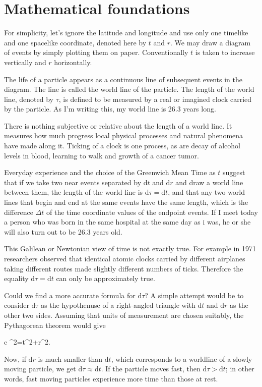 \documentclass[11pt,oneside%
]{memoir}
\newenvironment{eqna}{\begin{IEEEeqnarray*}{c}}{\end{IEEEeqnarray*}\ignorespacesafterend}
\newcommand{\dd}{\mathrm{d}}
\begin{document}
\section{Mathematical foundations}

For simplicity, let's ignore the latitude and longitude and use only one timelike and one spacelike coordinate, denoted here by \(t\) and \(r\). We may draw a diagram of events by simply plotting them on paper. Conventionally \(t\) is taken to increase vertically and \(r\) horizontally.

\newcommand{\myage}{26.3}

The life of a particle appears as a continuous line of subsequent events in the diagram. The line is called the world line of the particle. The length of the world line, denoted by \(\tau\), is defined to be measured by a real or imagined clock carried by the particle. As I'm writing this, my world line is {\myage} years long.

There is nothing subjective or relative about the length of a world line. It measures how much progress local physical processes and natural phenomena have made along it. Ticking of a clock is one process, as are decay of alcohol levels in blood, learning to walk and growth of a cancer tumor.

Everyday experience and the choice of the Greenwich Mean Time as \(t\) suggest that if we take two near events separated by \(\dd t\) and \(\dd r\) and draw a world line between them, the length of the world line is \(\dd\tau = \dd t\), and that any two world lines that begin and end at the same events have the same length, which is the difference \(\Delta t\) of the time coordinate values of the endpoint events. If I meet today a person who was born in the same hospital at the same day as i was, he or she will also turn out to be {\myage} years old.

This Galilean or Newtonian view of time is not exactly true. For example in 1971 researchers observed that identical atomic clocks carried by different airplanes taking different routes made slightly different numbers of ticks. Therefore the equality \(\dd\tau = \dd t\) can only be approximately true.

Could we find a more accurate formula for \(\dd\tau\)? A simple attempt would be to consider \(\dd\tau\) as the hypothenuse of a right-angled triangle with \(\dd t\) and \(\dd r\) as the other two sides. Assuming that units of measurement are chosen suitably, the Pythagorean theorem would give
\begin{eqna}
\dd\tau^2=\dd t^2+\dd r^2.
\end{eqna}
Now, if \(\dd r\) is much smaller than \(\dd t\), which corresponds to a worldline of a slowly moving particle, we get \(\dd\tau\approx\dd t\). If the particle moves fast, then \(\dd\tau>\dd t\); in other words, fast moving particles experience more time than those at rest.
\end{document}
